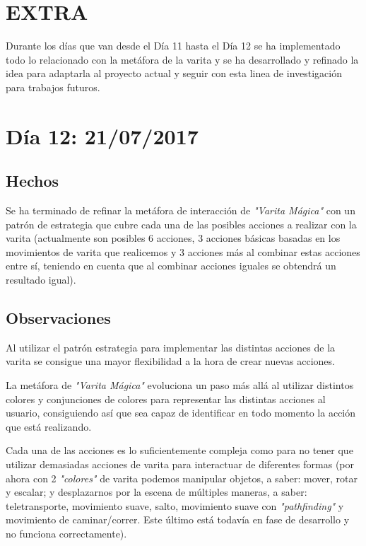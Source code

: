 \documentclass[12pt,a4paper]{article}
\begin{document}
\section{EXTRA}

Durante los días que van desde el Día 11 hasta el Día 12 se ha implementado todo lo relacionado con la metáfora de la varita y se ha desarrollado y refinado la idea para adaptarla al proyecto actual y seguir con esta linea de investigación para trabajos futuros.

\section{Día 12: 21/07/2017}

\subsection{Hechos}

Se ha terminado de refinar la metáfora de interacción de \textit{"Varita Mágica"} con un patrón de estrategia que cubre cada una de las posibles acciones a realizar con la varita (actualmente son posibles 6 acciones, 3 acciones básicas basadas en los movimientos de varita que realicemos y 3 acciones más al combinar estas acciones entre sí, teniendo en cuenta que al combinar acciones iguales se obtendrá un resultado igual).

\subsection{Observaciones}

Al utilizar el patrón estrategia para implementar las distintas acciones de la varita se consigue una mayor flexibilidad a la hora de crear nuevas acciones.

La metáfora de \textit{"Varita Mágica"} evoluciona un paso más allá al utilizar distintos colores y conjunciones de colores para representar las distintas acciones al usuario, consiguiendo así que sea capaz de identificar en todo momento la acción que está realizando.

Cada una de las acciones es lo suficientemente compleja como para no tener que utilizar demasiadas acciones de varita para interactuar de diferentes formas (por ahora con 2 \textit{"colores"} de varita podemos manipular objetos, a saber: mover, rotar y escalar; y desplazarnos por la escena de múltiples maneras, a saber: teletransporte, movimiento suave, salto, movimiento suave con \textit{"pathfinding"} y movimiento de caminar/correr. Este último está todavía en fase de desarrollo y no funciona correctamente).
\end{document}
